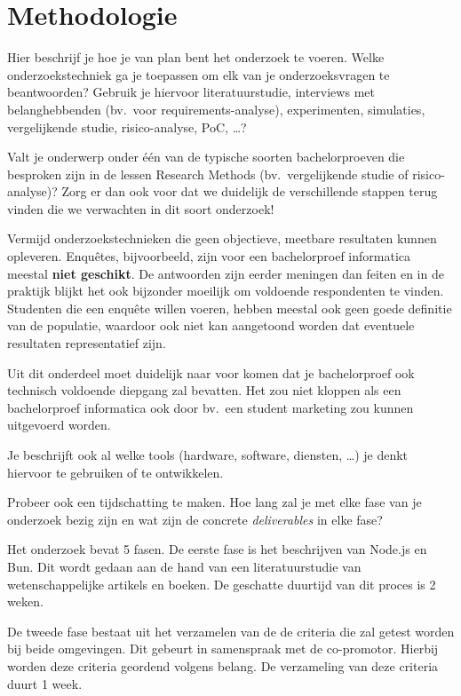 \section{Methodologie}%
\label{sec:methodologie}

Hier beschrijf je hoe je van plan bent het onderzoek te voeren. 
Welke onderzoekstechniek ga je toepassen om elk van je onderzoeksvragen te beantwoorden? 
Gebruik je hiervoor literatuurstudie, interviews met belanghebbenden (bv.~voor requirements-analyse),
 experimenten, simulaties, vergelijkende studie, risico-analyse, PoC, \ldots?

Valt je onderwerp onder één van de typische soorten bachelorproeven die besproken zijn in de lessen Research Methods 
(bv.\ vergelijkende studie of risico-analyse)? Zorg er dan ook voor dat we duidelijk de verschillende stappen 
terug vinden die we verwachten in dit soort onderzoek!

Vermijd onderzoekstechnieken die geen objectieve, meetbare resultaten kunnen opleveren. Enquêtes,
 bijvoorbeeld, zijn voor een bachelorproef informatica meestal \textbf{niet geschikt}. 
De antwoorden zijn eerder meningen dan feiten en in de praktijk blijkt het ook bijzonder moeilijk om 
voldoende respondenten te vinden. Studenten die een enquête willen voeren,
 hebben meestal ook geen goede definitie van de populatie,
 waardoor ook niet kan aangetoond worden dat eventuele resultaten representatief zijn.

Uit dit onderdeel moet duidelijk naar voor komen dat je bachelorproef ook technisch voldoen\-de diepgang zal bevatten.
Het zou niet kloppen als een bachelorproef informatica ook door bv.\ een student marketing zou kunnen uitgevoerd worden.

Je beschrijft ook al welke tools (hardware, software, diensten, \ldots) je denkt hiervoor te gebruiken of te ontwikkelen.

Probeer ook een tijdschatting te maken. Hoe lang zal je met elke fase van je onderzoek bezig zijn en wat zijn de concrete
 \emph{deliverables} 
in elke fase?

Het onderzoek bevat 5 fasen.
De eerste fase is het beschrijven van Node.js en Bun. 
Dit wordt gedaan aan de hand van een literatuurstudie van wetenschappelijke artikels en boeken. 
De geschatte duurtijd van dit proces is 2 weken.

De tweede fase bestaat uit het verzamelen van de de criteria die zal getest worden bij beide omgevingen. 
Dit gebeurt in samenspraak met de co-promotor. Hierbij worden deze criteria geordend volgens belang. 
De verzameling van deze criteria duurt 1 week.

